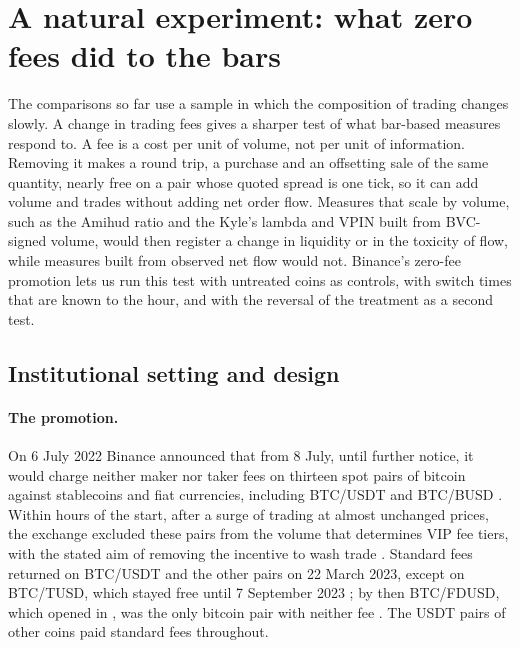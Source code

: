 \section{A natural experiment: what zero fees did to the bars}\label{sec:fee}

The comparisons so far use a sample in which the composition of trading changes slowly. A change in
trading fees gives a sharper test of what bar-based measures respond to. A fee is a cost per unit of
volume, not per unit of information. Removing it makes a round trip, a purchase and an offsetting
sale of the same quantity, nearly free on a pair whose quoted spread is one tick, so it can add
volume and trades without adding net order flow. Measures that scale by volume, such as the Amihud
ratio and the Kyle's lambda and VPIN built from BVC-signed volume, would then register a change in
liquidity or in the toxicity of flow, while measures built from observed net flow would not.
Binance's zero-fee promotion lets us run this test with untreated coins as controls, with switch
times that are known to the hour, and with the reversal of the treatment as a second test.

\subsection{Institutional setting and design}

\paragraph{The promotion.} On 6 July 2022 Binance announced that from 8 July, until further notice,
it would charge neither maker nor taker fees on thirteen spot pairs of bitcoin against stablecoins
and fiat currencies, including BTC/USDT and BTC/BUSD \citep{coindesk2022}. Within hours of the
start, after a surge of trading at almost unchanged prices, the exchange excluded these pairs from
the volume that determines VIP fee tiers, with the stated aim of removing the incentive to wash
trade \citep{decrypt2022}. Standard fees returned on BTC/USDT and the other pairs on 22 March 2023,
except on BTC/TUSD, which stayed free until 7 September 2023
\citep{coindesk2023,cryptonews2023}; by then BTC/FDUSD, which opened in \pairFdusdStart, was
the only bitcoin pair with neither fee \citep{cryptonews2023}. The USDT pairs of other coins paid
standard fees throughout.

